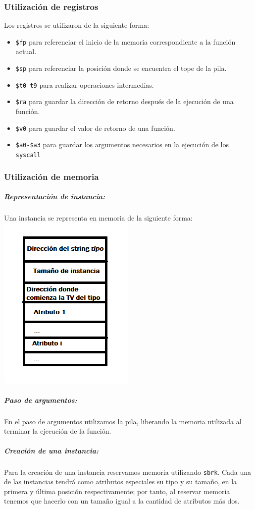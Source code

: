 \documentclass[a4paper,10pt,twocolumn]{article}
\begin{document}
\subsubsection{Utilización de registros}
Los registros se utilizaron de la siguiente forma:
\begin{itemize}
	\item \lstinline|$fp| para referenciar el inicio de la memoria correspondiente a la función actual.
	\item \lstinline|$sp| para referenciar la posición donde se encuentra el tope de la pila. 
	\item \lstinline|$t0-t9| para realizar operaciones intermedias. 
	\item \lstinline|$ra| para guardar la dirección de retorno después de la ejecución de una función. 
	\item \lstinline|$v0| para guardar el valor de retorno de una función. 
	\item \lstinline|$a0-$a3| para guardar los argumentos necesarios en la ejecución de los \lstinline|syscall|
\end{itemize}

\subsubsection{Utilización de memoria}

\subparagraph{Representación de instancia:}
	Una instancia se representa en memoria de la siguiente forma:
	\includegraphics[scale=0.7]{Instancia.png}

\subparagraph{Paso de argumentos:}
	 En el paso de argumentos utilizamos la pila, liberando la memoria utilizada al terminar la ejecución de la función. 
\subparagraph{Creación de una instancia:}
	Para la creación de una instancia reservamos memoria utilizando \lstinline|sbrk|. Cada una de las instancias tendrá como atributos especiales su tipo y su tamaño, en la primera y última posición respectivamente; por tanto, al reservar memoria tenemos que hacerlo con un tamaño igual a la cantidad de atributos más dos.
\end{document}
